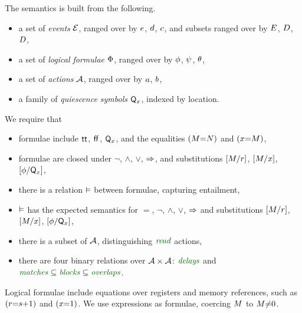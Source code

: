 The semantics is built from the following.
\begin{itemize}
\item a set of \emph{events} $\mathcal{E}$, ranged over by $e$, $d$,
  $c$, %
  and subsets ranged over by $E$, $D$, $D$,  
\item a set of \emph{logical formulae} $\Phi$, ranged over by $\phi$,
  $\psi$, $\theta$,
\item a set of \emph{actions} $\mathcal{A}$, ranged over by $a$, $b$,
\item a family of \emph{quiescence symbols} $\mathsf{Q}_{x}$, indexed by location.
\end{itemize}

We require that
\begin{itemize}
\item formulae include $\mathsf{tt}$, $\mkern.6mu\mathsf{ff}\mkern.6mu$, $\mathsf{Q}_{x}$, and the equalities $(M{=}N)$ and $(x{=}M)$,
\item formulae are closed under $\lnot$, $\land$, $\lor$, $\mathbin{\Rightarrow}$, and
  substitutions $[M/r]$, $[M/x]$, $[\phi/\mathsf{Q}_{x}]$,
\item there is a relation $\mathrel{\vDash}$ between
  formulae, capturing entailment, %
\item $\mathrel{\vDash}$ has the expected semantics for $=$, $\lnot$,
  $\land$, $\lor$, $\mathbin{\Rightarrow}$ and substitutions $[M/r]$,
  $[M/x]$, $[\phi/\mathsf{Q}_{x}]$,
\item there is a subset of $\mathcal{A}$, distinguishing
  $\sreaddef$ actions,
\item there are four binary relations over $\mathcal{A}\times\mathcal{A}$:
  $\rdelaysdef$ and ${\rmatchesdef}\subseteq{\rblocksdef}\subseteq{\roverlapsdef}$.
\end{itemize}

Logical formulae include equations over registers and memory references, such as
$(r{=}s{+}1)$ and $(x{=}1)$.
We use expressions as formulae, coercing $M$ to $M{\neq}0$.

